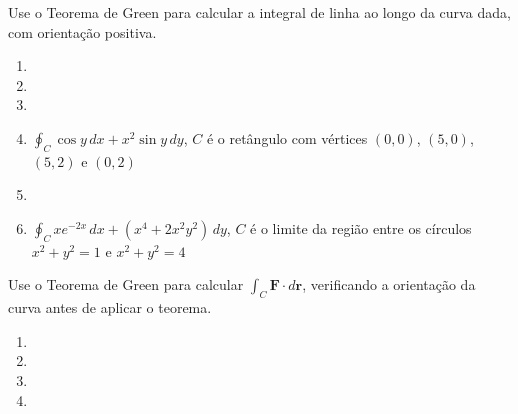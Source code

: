 



	
	
	\vspace{5mm}
	
	Use o Teorema de Green para calcular a integral de linha ao longo da curva dada, com orientação positiva.
	
	\begin{enumerate}
		
		\item
		\resposta{}

		\item
		\resposta{}

		\item
		\resposta{}

		\item $\displaystyle \oint_C \cos y \, dx + x^{2}\sin y \, dy$, \; $C$ é o retângulo com vértices $(0,0)$, $(5,0)$, $(5,2)$ e $(0,2)$\\
		\resposta{\fazer}

		\item
		\resposta{}

		\item $\displaystyle \oint_C xe^{-2x} \, dx + (x^4 + 2x^{2}y^{2}) \, dy$, \; $C$ é o limite da região entre os círculos $x^2 + y^2 = 1$ e $x^2 + y^2 = 4$\\
		\resposta{\fazer}
		
	\end{enumerate}
	
	\vspace{5mm}
	
	Use o Teorema de Green para calcular $\displaystyle \int_C \textbf{F} \cdot d\textbf{r}$, verificando a orientação da curva antes de aplicar o teorema.
	
	\begin{enumerate}[resume]

		\item
		\resposta{}

		\item
		\resposta{}

		\item
		\resposta{}

		\item
		\resposta{}
	
	\end{enumerate}
		
	\vspace{5mm}	
	
	


